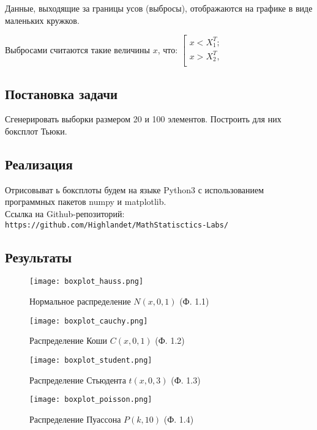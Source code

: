 \documentclass[14pt]{extarticle}
\begin{document}
Данные, выходящие за границы усов (выбросы), отображаются на графике в виде маленьких кружков.

Выбросами считаются такие величины \(x\), что:
$\left[
      \begin{gathered}
        x < X_1^T; \\
        x > X_2^T, \\
      \end{gathered}
\right.$

\subsection{Постановка задачи}

Сгенерировать выборки размером 20 и 100 элементов. Построить для них боксплот Тьюки.

\subsection{Реализация}

Отрисовыват ь боксплоты будем на языке Python3 с использованием программных пакетов numpy и matplotlib.\\
Ссылка на Github-репозиторий: \texttt{https://github.com/Highlandet/MathStatisctics-Labs/}

\subsection{Результаты}

\begin{figure}[H]
    \centering
    \texttt{[image: boxplot\_hauss.png]}
    \caption{Нормальное распределение \(N(x, 0, 1)\) (Ф. 1.1)}
    \label{fig:enter-label}
\end{figure}

\begin{figure}[H]
    \centering
    \texttt{[image: boxplot\_cauchy.png]}
    \caption{Распределение Коши \(C(x, 0, 1)\) (Ф. 1.2)}
    \label{fig:enter-label}
\end{figure}

\begin{figure}[H]
    \centering
    \texttt{[image: boxplot\_student.png]}
    \caption{Распределение Стьюдента \(t(x, 0, 3)\) (Ф. 1.3)}
    \label{fig:enter-label}
\end{figure}

\begin{figure}[H]
    \centering
    \texttt{[image: boxplot\_poisson.png]}
    \caption{Распределение Пуассона \(P(k, 10)\) (Ф. 1.4)}
    \label{fig:enter-label}
\end{figure}
\end{document}
